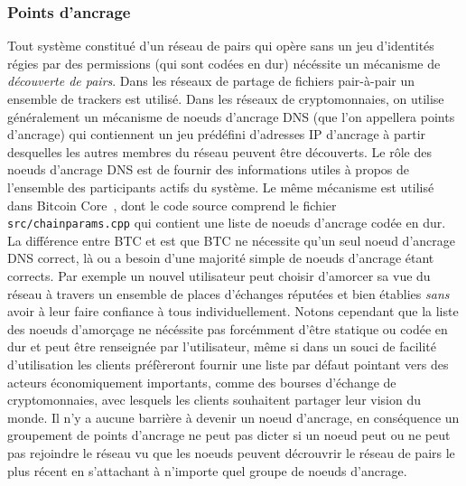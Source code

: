 \documentclass[runningheads]{llncs}
\begin{document}
\subsubsection{Points d'ancrage}
Tout système constitué d'un réseau de pairs qui opère sans un jeu d'identités régies par des permissions (qui sont
codées en dur) nécéssite un mécanisme de \emph{découverte de pairs}. Dans les réseaux de partage de fichiers pair-à-pair
un ensemble de trackers est utilisé. Dans les réseaux de cryptomonnaies, on utilise généralement un mécanisme de noeuds
d'ancrage DNS (que l'on appellera points d'ancrage) qui contiennent un jeu prédéfini d'adresses IP d'ancrage à partir
desquelles les autres membres du réseau peuvent être découverts. Le rôle des noeuds d'ancrage DNS est de fournir des
informations utiles à propos de l'ensemble des participants actifs du système. Le même mécanisme est utilisé dans
Bitcoin Core~\cite{bitcoin_2018}, dont le code source comprend le fichier \texttt{src/chainparams.cpp} qui contient
une liste de noeuds d'ancrage codée en dur. La différence entre BTC et \AVAPlatformName{} est que BTC ne nécessite
qu'un seul noeud d'ancrage DNS correct, là ou \AVAPlatformName{} a besoin d'une majorité simple de noeuds d'ancrage
étant corrects. Par exemple un nouvel utilisateur peut choisir d'amorcer sa vue du réseau à travers un ensemble
de places d'échanges réputées et bien établies \emph{sans} avoir à leur faire confiance à tous individuellement. Notons
cependant que la liste des noeuds d'amorçage ne nécéssite pas forcémment d'être statique ou codée en dur et peut être
renseignée par l'utilisateur, même si dans un souci de facilité d'utilisation les clients préfèreront fournir une liste
par défaut pointant vers des acteurs économiquement importants, comme des bourses d'échange de cryptomonnaies, avec
lesquels les clients souhaitent partager leur vision du monde. Il n'y a aucune barrière à devenir un noeud d'ancrage,
en conséquence un groupement de points d'ancrage ne peut pas dicter si un noeud peut ou ne peut pas rejoindre le
réseau vu que les noeuds peuvent décrouvrir le réseau de pairs \AVAPlatformName{} le plus récent en s'attachant à
n'importe quel groupe de noeuds d'ancrage.
\end{document}
